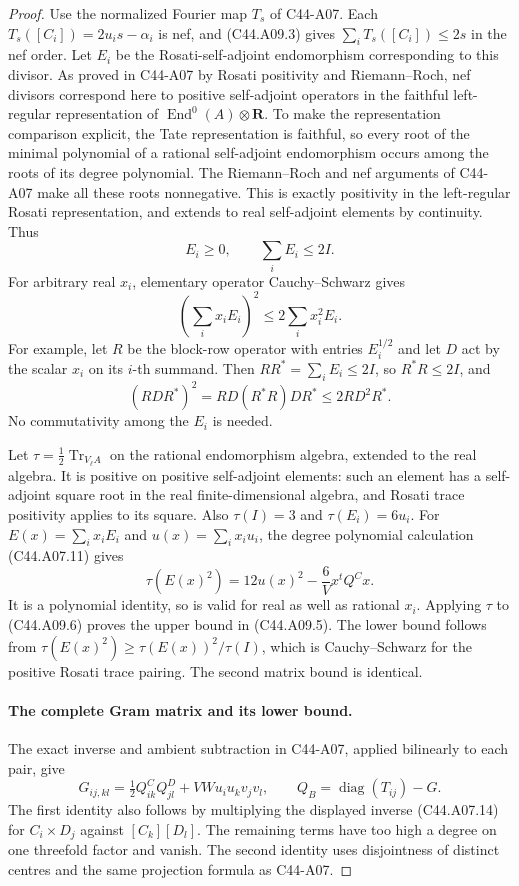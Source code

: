 \documentclass[11pt]{article}
\theoremstyle{remark}\newtheorem{remark}[theorem]{Remark}
\begin{document}
\begin{proof}
Use the normalized Fourier map $T_s$ of C44-A07. Each
$T_s([C_i])=2u_is-\alpha_i$ is nef, and (C44.A09.3) gives
$\sum_iT_s([C_i])\le2s$ in the nef order. Let $E_i$ be the
Rosati-self-adjoint endomorphism corresponding to this divisor.
As proved in C44-A07 by Rosati positivity and Riemann--Roch,
nef divisors correspond here to positive self-adjoint operators
in the faithful left-regular representation of
$\operatorname{End}^0(A)\otimes\mathbf R$. To make the
representation comparison explicit, the Tate representation is
faithful, so every root of the minimal polynomial of a rational
self-adjoint endomorphism occurs among the roots of its degree
polynomial. The Riemann--Roch and nef arguments of C44-A07 make
all these roots nonnegative. This is exactly positivity in the
left-regular Rosati representation, and extends to real
self-adjoint elements by continuity. Thus
\[
                        E_i\ge0,\qquad \sum_iE_i\le2I.
\]
For arbitrary real $x_i$, elementary operator Cauchy--Schwarz gives
\[
             \left(\sum_i x_iE_i\right)^2
                         \le2\sum_i x_i^2E_i.
 \tag{C44.A09.6}
\]
For example, let $R$ be the block-row operator with entries
$E_i^{1/2}$ and let $D$ act by the scalar $x_i$ on its $i$-th
summand. Then $RR^*=\sum_iE_i\le2I$, so $R^*R\le2I$, and
\[
 (RDR^*)^2=RD(R^*R)DR^*\le2RD^2R^*.
\]
No commutativity among the $E_i$ is needed.

Let $\tau=\tfrac12\operatorname{Tr}_{V_\ell A}$ on the rational
endomorphism algebra, extended to the real algebra. It is
positive on positive self-adjoint elements: such an element
has a self-adjoint square root in the real finite-dimensional
algebra, and Rosati trace positivity applies to its square.
Also $\tau(I)=3$ and $\tau(E_i)=6u_i$. For
$E(x)=\sum_i x_iE_i$ and $u(x)=\sum_i x_iu_i$, the degree
polynomial calculation (C44.A07.11) gives
\[
 \tau(E(x)^2)=12u(x)^2-\frac6Vx^tQ^Cx.
 \tag{C44.A09.7}
\]
It is a polynomial identity, so is valid for real as well as
rational $x_i$. Applying $\tau$ to (C44.A09.6) proves the
upper bound in (C44.A09.5). The lower bound follows from
$\tau(E(x)^2)\ge\tau(E(x))^2/\tau(I)$, which is
Cauchy--Schwarz for the positive Rosati trace pairing. The
second matrix bound is identical.

\paragraph{The complete Gram matrix and its lower bound.}
The exact inverse and ambient subtraction in C44-A07, applied
bilinearly to each pair, give
\[
 G_{ij,kl}=\tfrac12 Q^C_{ik}Q^D_{jl}
                              +VWu_iu_kv_jv_l,
 \qquad
 Q_B=\operatorname{diag}(T_{ij})-G.
 \tag{C44.A09.8}
\]
The first identity also follows by multiplying the displayed
inverse (C44.A07.14) for $C_i\times D_j$ against
$[C_k][D_l]$. The remaining terms have too high a degree on one
threefold factor and vanish. The second identity uses disjointness
of distinct centres and the same projection formula as C44-A07.


\end{proof}
\end{document}

